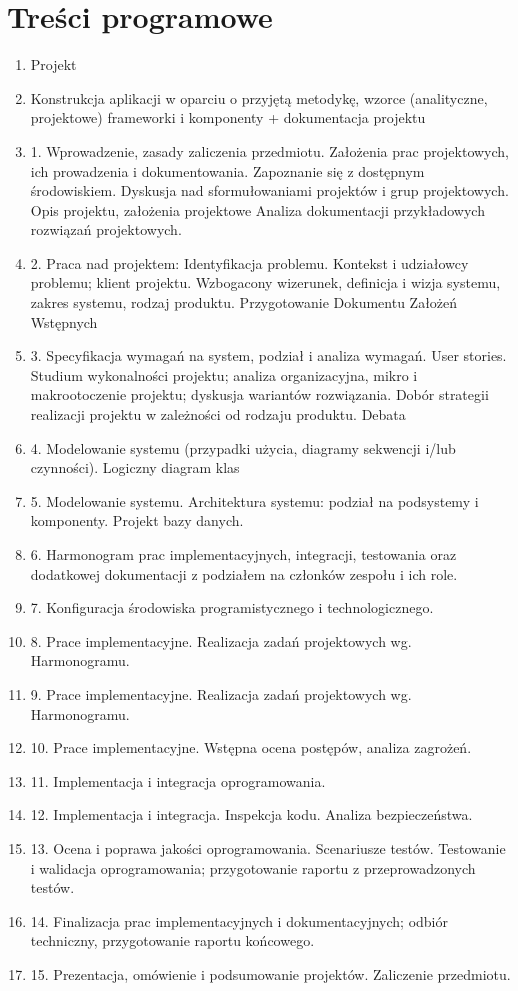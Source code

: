 \documentclass[12pt, a4paper]{article}
\begin{document}
\section{Treści programowe}

\begin{enumerate}
  \item Projekt
  \item Konstrukcja aplikacji w oparciu o przyjętą metodykę, wzorce (analityczne, projektowe) frameworki i komponenty + dokumentacja projektu
  \item 1. Wprowadzenie, zasady zaliczenia przedmiotu. Założenia prac projektowych, ich prowadzenia i dokumentowania. Zapoznanie się z dostępnym środowiskiem. Dyskusja nad sformułowaniami projektów i grup projektowych. Opis projektu, założenia projektowe Analiza dokumentacji przykładowych rozwiązań projektowych.
  \item 2. Praca nad projektem: Identyfikacja problemu. Kontekst i udziałowcy problemu; klient projektu. Wzbogacony wizerunek, definicja i wizja systemu, zakres systemu, rodzaj produktu. Przygotowanie Dokumentu Założeń Wstępnych
  \item 3. Specyfikacja wymagań na system, podział i analiza wymagań. User stories. Studium wykonalności projektu; analiza organizacyjna, mikro i makrootoczenie projektu; dyskusja wariantów rozwiązania. Dobór strategii realizacji projektu w zależności od rodzaju produktu. Debata
  \item 4. Modelowanie systemu (przypadki użycia, diagramy sekwencji i/lub czynności). Logiczny diagram klas
  \item 5. Modelowanie systemu. Architektura systemu: podział na podsystemy i komponenty. Projekt bazy danych.
  \item 6. Harmonogram prac implementacyjnych, integracji, testowania oraz dodatkowej dokumentacji z podziałem na członków zespołu i ich role.
  \item 7. Konfiguracja środowiska programistycznego i technologicznego.
  \item 8. Prace implementacyjne. Realizacja zadań projektowych wg. Harmonogramu.
  \item 9. Prace implementacyjne. Realizacja zadań projektowych wg. Harmonogramu.
  \item 10. Prace implementacyjne. Wstępna ocena postępów, analiza zagrożeń.
  \item 11. Implementacja i integracja oprogramowania.
  \item 12. Implementacja i integracja. Inspekcja kodu. Analiza bezpieczeństwa.
  \item 13. Ocena i poprawa jakości oprogramowania. Scenariusze testów. Testowanie i walidacja oprogramowania; przygotowanie raportu z przeprowadzonych testów.
  \item 14. Finalizacja prac implementacyjnych i dokumentacyjnych; odbiór techniczny, przygotowanie raportu końcowego.
  \item 15. Prezentacja, omówienie i podsumowanie projektów. Zaliczenie przedmiotu.
\end{enumerate}
\end{document}
